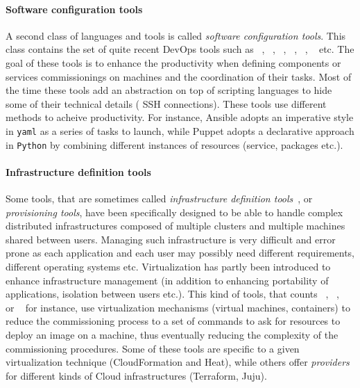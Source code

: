 \paragraph{Software configuration tools}
A second class of languages and tools is called \emph{software
  configuration tools}. This class contains the set of quite recent
DevOps tools such as \ansible~\cite{}, \deployware~\cite{},
\puppet~\cite{}, \chef~\cite{}, \salt~\cite{}, \aeolus~\cite{} etc. The
goal of these tools is to enhance the productivity when defining
components or services commissionings on machines and the coordination
of their tasks. Most of the time these tools add an abstraction on top
of scripting languages to hide some of their technical details (\eg
SSH connections). These tools use different methods to acheive
productivity. For instance, Ansible adopts an imperative style in
\texttt{yaml} as a series of tasks to launch, while Puppet adopts a
declarative approach in \texttt{Python} by combining different
instances of resources (\ie service, packages etc.).

\paragraph{Infrastructure definition tools}
Some tools, that are sometimes called \emph{infrastructure definition
  tools}~\cite{}, or \emph{provisioning tools}, have been specifically
designed to be able to handle complex distributed infrastructures
composed of multiple clusters and multiple machines shared between
users. Managing such infrastructure is very difficult and error prone
as each application and each user may possibly need different
requirements, different operating systems etc. Virtualization has
partly been introduced to enhance infrastructure management (in
addition to enhancing portability of applications, isolation between
users etc.). This kind of tools, that counts \terraform~\cite{},
\juju~\cite{}, \cloudformation~\cite{} or \heat~\cite{} for instance, use
virtualization mechanisms (\eg virtual machines, containers) to reduce
the commissioning process to a set of commands to ask for resources to
deploy an image on a machine, thus eventually reducing the complexity
of the commissioning procedures. Some of these tools are specific to a
given virtualization technique (\eg CloudFormation and Heat), while
others offer \emph{providers} for different kinds of Cloud
infrastructures (\eg Terraform, Juju).

